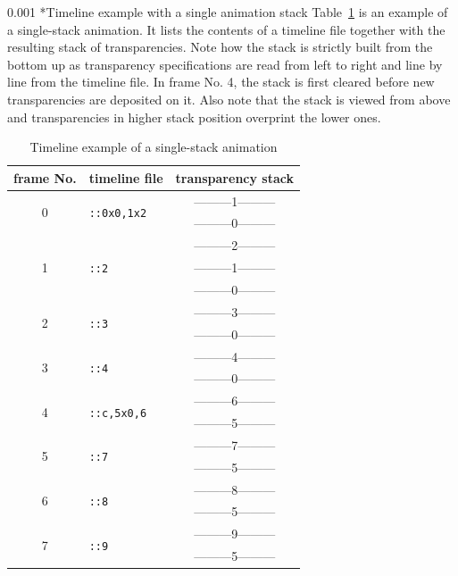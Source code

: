 \documentclass[a4paper]{article}
\makeatletter
\newcommand\myparagraph{\@startsection{paragraph}{3}{\z@}%
                                     {\parskip}%
                                     {0.001\parskip}%
                                     {\itshape\normalsize}}
\makeatother
\begin{document}
\myparagraph*{Timeline example with a single animation stack}
Table~\ref{tab:single} is an example of a single-stack animation. It lists the contents of a timeline file together with the resulting stack of transparencies. Note how the stack is strictly built from the bottom up as transparency specifications are read from left to right and line by line from the timeline file. In frame No. 4, the stack is first cleared before new transparencies are deposited on it. Also note that the stack is viewed from above and transparencies in higher stack position overprint the lower ones.

\begin{table}[h]\centering
\caption{Timeline example of a single-stack animation}\label{tab:single}
\begin{tabular}[t]{c|l|c}\hline
frame No. & timeline file & transparency stack\\\hline\hline
\multirow{2}{*}{0} & \multirow{2}{*}{\tt::0x0,1x2} & ---------1---------\\&&---------0---------\\\cline{1-1}\cline{3-3}
\multirow{3}{*}{1} & \multirow{3}{*}{\tt::2} & ---------2---------\\&&---------1---------\\&&---------0---------\\\cline{1-1}\cline{3-3}
\multirow{2}{*}{2} & \multirow{2}{*}{\tt::3} & ---------3---------\\&&---------0---------\\\cline{1-1}\cline{3-3}
\multirow{2}{*}{3} & \multirow{2}{*}{\tt::4} & ---------4---------\\&&---------0---------\\\cline{1-1}\cline{3-3}
\multirow{2}{*}{4} & \multirow{2}{*}{\tt::c,5x0,6} & ---------6---------\\&&---------5---------\\\cline{1-1}\cline{3-3}
\multirow{2}{*}{5} & \multirow{2}{*}{\tt::7} & ---------7---------\\&&---------5---------\\\cline{1-1}\cline{3-3}
\multirow{2}{*}{6} & \multirow{2}{*}{\tt::8} & ---------8---------\\&&---------5---------\\\cline{1-1}\cline{3-3}
\multirow{2}{*}{7} & \multirow{2}{*}{\tt::9} & ---------9---------\\&&---------5---------\\\hline
\end{tabular}
\end{table}
\end{document}
